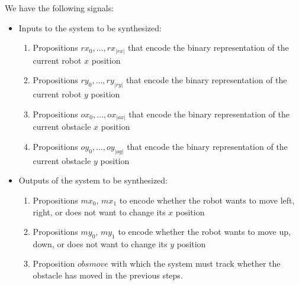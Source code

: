 \documentclass[a4paper,conference,10pt]{IEEEtran}
\begin{document}
We have the following signals:
\begin{itemize}
\item Inputs to the system to be synthesized:
\begin{enumerate}
\item Propositions $\mathit{rx}_0, \ldots, \mathit{rx}_{|\mathit{rx}|}$ that encode the binary representation of the current robot $x$ position
\item Propositions $\mathit{ry}_0, \ldots, \mathit{ry}_{|\mathit{ry}|}$ that encode the binary representation of the current robot $y$ position
\item Propositions $\mathit{ox}_0, \ldots, \mathit{ox}_{|\mathit{ox}|}$ that encode the binary representation of the current obstacle $x$ position
\item Propositions $\mathit{oy}_0, \ldots, \mathit{oy}_{|\mathit{oy}|}$ that encode the binary representation of the current obstacle $y$ position
\end{enumerate}
\item Outputs of the system to be synthesized:
\begin{enumerate}
\item Propositions $\mathit{mx}_0$, $\mathit{mx}_1$ to encode whether the robot wants to move left, right, or does not want to change its $x$ position
\item Propositions $\mathit{my}_0$, $\mathit{my}_1$ to encode whether the robot wants to move up, down, or does not want to change its $y$ position
\item Proposition $\mathit{obsmove}$ with which the system must track whether the obstacle has moved in the previous steps.
\end{enumerate}
\end{itemize}
\end{document}
